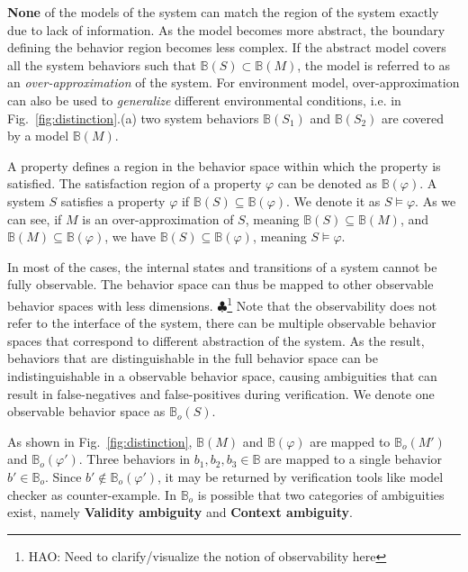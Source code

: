 \documentclass{llncs}
\newcommand{\figref}[1]{Fig.~\ref{fig:#1}}
\newcommand{\Hao}[1]{$\clubsuit$\footnote{HAO: #1}}
\begin{document}
\textbf{None} of the models of the system can match the region of the system exactly due to lack of information. As the model becomes more abstract, the boundary defining the behavior region becomes less complex. If the abstract model covers all the system behaviors such that $\mathbb{B}(S)\subset\mathbb{B}(M)$, the model is referred to as an \emph{over-approximation} of the system. For environment model, over-approximation can also be used to \emph{generalize} different environmental conditions, i.e. in \figref{distinction}.(a) two system behaviors $\mathbb{B}(S_1)$ and $\mathbb{B}(S_2)$ are covered by a model $\mathbb{B}(M)$.

A property defines a region in the behavior space within which the property is satisfied. The satisfaction region of a property $\varphi$ can be denoted as $\mathbb{B}(\varphi)$. 
A system $S$ satisfies a property $\varphi$ if $\mathbb{B}(S)\subseteq \mathbb{B}(\varphi)$. We denote it as $S\models\varphi$. As we can see, if $M$ is an over-approximation of $S$, meaning $\mathbb{B}(S)\subseteq \mathbb{B}(M)$, and $\mathbb{B}(M)\subseteq \mathbb{B}(\varphi)$, we have $\mathbb{B}(S)\subseteq \mathbb{B}(\varphi)$, meaning $S\models\varphi$. 

In most of the cases, the internal states and transitions of a system cannot be fully observable. The behavior space can thus be mapped to other observable behavior spaces with less dimensions.
\Hao{Need to clarify/visualize the notion of observability here} 
Note that the observability does not refer to the interface of the system, there can be multiple observable behavior spaces that correspond to different abstraction of the system. As the result, behaviors that are distinguishable in the full behavior space can be indistinguishable in a observable behavior space, causing ambiguities that can result in false-negatives and false-positives during verification. We denote one observable behavior space as $\mathbb{B}_o(S)$. 

As shown in \figref{distinction}, $\mathbb{B}(M)$ and $\mathbb{B}(\varphi)$ are mapped to $\mathbb{B}_o(M')$ and $\mathbb{B}_o(\varphi')$. Three behaviors in $b_1,b_2,b_3\in\mathbb{B}$ are mapped to a single behavior $b'\in\mathbb{B}_o$. Since $b'\not\in\mathbb{B}_o(\varphi')$, it may be returned by verification tools like model checker as counter-example. In $\mathbb{B}_o$ is possible that two categories of ambiguities exist, namely \textbf{Validity ambiguity} and \textbf{Context ambiguity}. %
\end{document}
